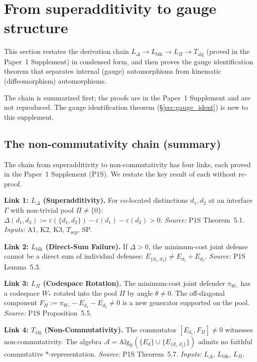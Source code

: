 \documentclass[11pt,a4paper]{article}
\theoremstyle{definition}
\newcommand{\eps}{\varepsilon}
\begin{document}
\newpage


\section{From superadditivity to gauge structure}
\label{sec:nc_chain}

This section restates the derivation chain $L_\Delta \to L_{\mathrm{blk}}
\to L_\Pi \to T_{\mathrm{alg}}$ (proved in the Paper~1 Supplement) in
condensed form, and then proves the gauge identification theorem that
separates internal (gauge) automorphisms from kinematic (diffeomorphism)
automorphisms.

The chain is summarized first; the proofs are in the Paper~1 Supplement
and are not reproduced.  The gauge identification theorem
(\S\ref{sec:gauge_ident}) is new to this supplement.


\subsection{The non-commutativity chain (summary)}
\label{sec:nc_summary}

The chain from superadditivity to non-commutativity has four links,
each proved in the Paper~1 Supplement (P1S).  We restate the key result
of each without re-proof.

\smallskip\noindent\textbf{Link 1: $L_\Delta$ (Superadditivity).}
For co-located distinctions $d_1, d_2$ at an interface $\Gamma$ with
non-trivial pool $\Pi \ne \{0\}$:
$\Delta(d_1, d_2) := \eps(\{d_1, d_2\}) - \eps(d_1) - \eps(d_2) > 0$.
\textit{Source:} P1S Theorem~5.1.  \textit{Inputs:} A1, K2, K3,
$T_{\mathrm{sep}}$, SP.

\smallskip\noindent\textbf{Link 2: $L_{\mathrm{blk}}$ (Direct-Sum Failure).}
If $\Delta > 0$, the minimum-cost joint defense cannot be a direct sum
of individual defenses: $E_{\{d_1,d_2\}} \ne E_{d_1} + E_{d_2}$.
\textit{Source:} P1S Lemma~5.3.

\smallskip\noindent\textbf{Link 3: $L_\Pi$ (Codespace Rotation).}
The minimum-cost joint defender $\pi_{W_*}$ has a codespace $W_*$ rotated
into the pool $\Pi$ by angle $\theta \ne 0$.  The off-diagonal component
$F_\Pi := \pi_{W_*} - E_{d_1} - E_{d_2} \ne 0$ is a new generator
supported on the pool.
\textit{Source:} P1S Proposition~5.5.

\smallskip\noindent\textbf{Link 4: $T_{\mathrm{alg}}$ (Non-Commutativity).}
The commutator $[E_{d_1}, F_\Pi] \ne 0$ witnesses non-commutativity.
The algebra $\mathcal{A} = \mathrm{Alg}_\mathbb{R}(\{E_d\} \cup
\{E_{\{d_i,d_j\}}\})$ admits no faithful commutative
$*$-representation.
\textit{Source:} P1S Theorem~5.7.  \textit{Inputs:} $L_\Delta$,
$L_{\mathrm{blk}}$, $L_\Pi$.
\end{document}
